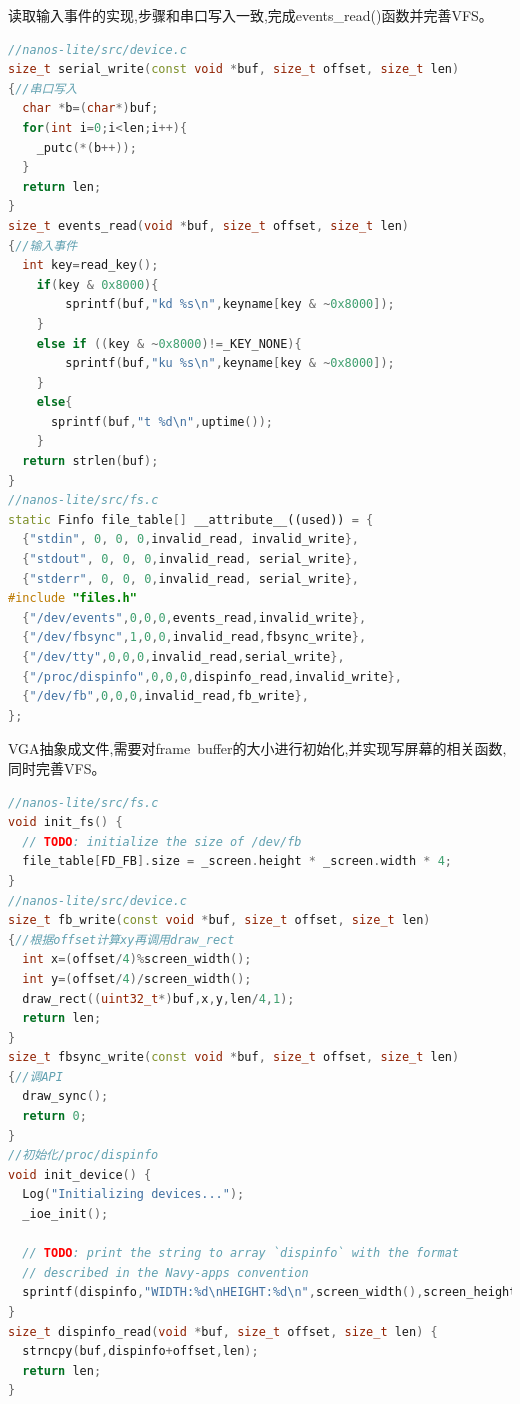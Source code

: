 \documentclass[UTF8,a4paper,10pt]{ctexart}
\begin{document}
{{    读取输入事件的实现,步骤和串口写入一致,完成events\_read()函数并完善VFS。
    \begin{lstlisting}[title=serial\&events,frame=trbl,language={C++}]
//nanos-lite/src/device.c 
size_t serial_write(const void *buf, size_t offset, size_t len) 
{//串口写入
  char *b=(char*)buf;
  for(int i=0;i<len;i++){
    _putc(*(b++));
  }
  return len;
}
size_t events_read(void *buf, size_t offset, size_t len) 
{//输入事件
  int key=read_key();
    if(key & 0x8000){
        sprintf(buf,"kd %s\n",keyname[key & ~0x8000]);
    }
    else if ((key & ~0x8000)!=_KEY_NONE){
        sprintf(buf,"ku %s\n",keyname[key & ~0x8000]);
    }
    else{
      sprintf(buf,"t %d\n",uptime());
    }
  return strlen(buf);
}
//nanos-lite/src/fs.c 
static Finfo file_table[] __attribute__((used)) = {
  {"stdin", 0, 0, 0,invalid_read, invalid_write},
  {"stdout", 0, 0, 0,invalid_read, serial_write},
  {"stderr", 0, 0, 0,invalid_read, serial_write},
#include "files.h"
  {"/dev/events",0,0,0,events_read,invalid_write},
  {"/dev/fbsync",1,0,0,invalid_read,fbsync_write},
  {"/dev/tty",0,0,0,invalid_read,serial_write},
  {"/proc/dispinfo",0,0,0,dispinfo_read,invalid_write},
  {"/dev/fb",0,0,0,invalid_read,fb_write},
};
  \end{lstlisting}

  VGA抽象成文件,需要对frame\ buffer的大小进行初始化,并实现写屏幕的相关函数,同时完善VFS。
  \begin{lstlisting}[title=serial\&events,frame=trbl,language={C++}]
//nanos-lite/src/fs.c 
void init_fs() {
  // TODO: initialize the size of /dev/fb
  file_table[FD_FB].size = _screen.height * _screen.width * 4;
}
//nanos-lite/src/device.c 
size_t fb_write(const void *buf, size_t offset, size_t len) 
{//根据offset计算xy再调用draw_rect
  int x=(offset/4)%screen_width(); 
  int y=(offset/4)/screen_width();
  draw_rect((uint32_t*)buf,x,y,len/4,1);
  return len;
}
size_t fbsync_write(const void *buf, size_t offset, size_t len) 
{//调API
  draw_sync();
  return 0;
}
//初始化/proc/dispinfo
void init_device() {
  Log("Initializing devices...");
  _ioe_init();

  // TODO: print the string to array `dispinfo` with the format
  // described in the Navy-apps convention
  sprintf(dispinfo,"WIDTH:%d\nHEIGHT:%d\n",screen_width(),screen_height());
}
size_t dispinfo_read(void *buf, size_t offset, size_t len) {
  strncpy(buf,dispinfo+offset,len);
  return len;
}
  \end{lstlisting}

}}
\end{document}
